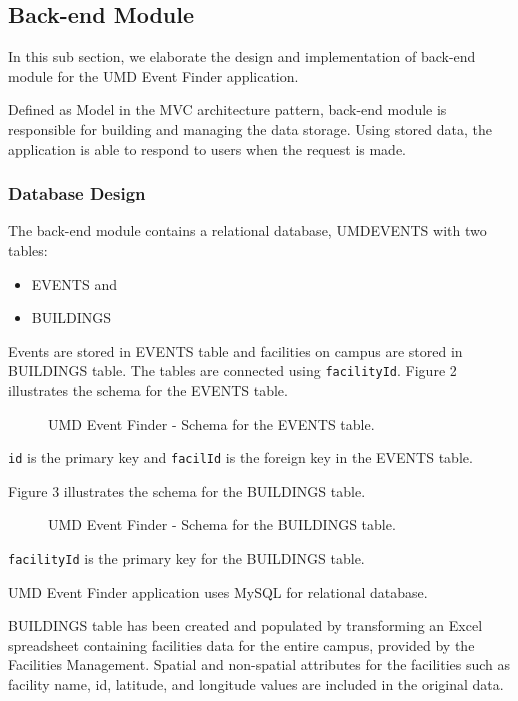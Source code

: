 \documentclass{acm_proc_article-sp}
\begin{document}
\subsection{Back-end Module}
In this sub section, we elaborate the design and implementation of back-end module for the UMD Event Finder application. 

Defined as Model in the MVC architecture pattern, back-end module is responsible for building and managing the data storage. Using stored data, the application is able to respond to users when the request is made. 

\subsubsection{Database Design}
The back-end module contains a relational database, UMDEVENTS with two tables:
\begin{itemize}
\item EVENTS and
\item BUILDINGS 
\end{itemize}

Events are stored in EVENTS table and facilities on campus are stored in BUILDINGS table. The tables are connected using \texttt{facilityId}. Figure 2 illustrates the schema for the EVENTS table. 

\begin{figure}
\centering
{}
\caption{UMD Event Finder - Schema for the EVENTS table.}
\end{figure}

\texttt{id} is the primary key and \texttt{facilId} is the foreign key in the EVENTS table. 

Figure 3 illustrates the schema for the BUILDINGS table. 

\begin{figure}
\centering
{}
\caption{UMD Event Finder - Schema for the BUILDINGS table.}
\end{figure}

\texttt{facilityId} is the primary key for the BUILDINGS table. 

UMD Event Finder application uses MySQL for relational database. 

BUILDINGS table has been created and populated by transforming an Excel spreadsheet containing facilities data for the entire campus, provided by the Facilities Management. Spatial and non-spatial attributes for the facilities such as facility name, id, latitude, and longitude values are included in the original data.
\end{document}
